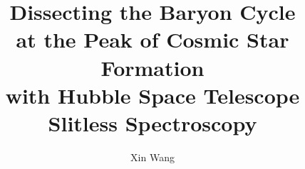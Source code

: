 \documentclass[PhD]{uclathes}
\title          {Dissecting the Baryon Cycle\\
                 at the Peak of Cosmic Star Formation\\
                 with Hubble Space Telescope Slitless Spectroscopy}
\author         {Xin Wang}
\begin{document}
\makeintropages

%


%







\end{document}
